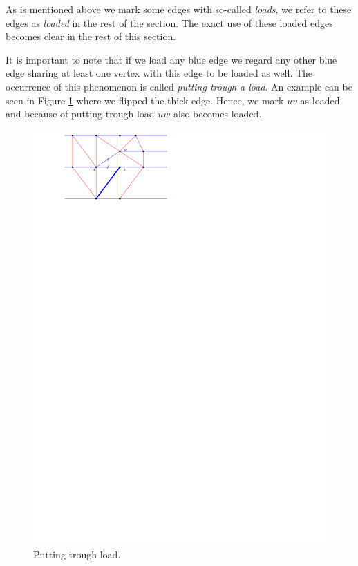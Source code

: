   As is mentioned above we mark some edges with so-called \emph{loads}, we refer to these edges as \emph{loaded} in the rest of the section.
  The exact use of these loaded edges becomes clear in the rest of this section.

  It is important to note that if we load any blue edge we regard any other blue edge sharing at least one vertex with this edge to be loaded as well.
  The occurrence of this phenomenon is called \emph{putting trough a load}.
  An example can be seen in Figure \ref{fig:subdiv:putTrougLoad} where we flipped the thick edge.
  Hence, we mark $uv$ as loaded and because of putting trough load $uw$ also becomes loaded.

  \begin{figure}[h]
    \centering
    \includegraphics[scale=1]{blueFaceSubdivision/img/puttingTroughLoad.pdf}
    \caption{Putting trough load.}
    \label{fig:subdiv:putTrougLoad}
  \end{figure}


